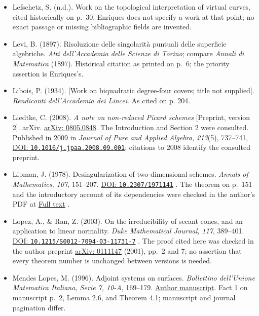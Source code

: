 \begin{sloppypar}
\begin{itemize}
\item Lefschetz, S. (n.d.). Work on the topological interpretation of virtual curves, cited historically on p.~30. Enriques does not specify a work at that point; no exact passage or missing bibliographic fields are invented.

\item Levi, B. (1897). Risoluzione delle singolarità puntuali delle superficie algebriche. \emph{Atti dell'Accademia delle Scienze di Torino}; compare \emph{Annali di Matematica} (1897). Historical citation as printed on p.~6; the priority assertion is Enriques's.

\item Libois, P. (1934). [Work on biquadratic degree-four covers; title not supplied]. \emph{Rendiconti dell'Accademia dei Lincei}. As cited on p. 204.

\item Liedtke, C. (2008). \emph{A note on non-reduced Picard schemes} {[}Preprint, version 2{]}. arXiv. \href{https://arxiv.org/abs/0805.0848}{arXiv: 0805.0848}. The Introduction and Section 2 were consulted. Published in 2009 in \emph{Journal of Pure and Applied Algebra, 213}(5), 737--741, \href{https://doi.org/10.1016/j.jpaa.2008.09.001}{DOI: \nolinkurl{10.1016/j.jpaa.2008.09.001}}; citations to 2008 identify the consulted preprint.

\item Lipman, J. (1978). Desingularization of two-dimensional schemes. \emph{Annals of Mathematics, 107}, 151--207. \href{https://doi.org/10.2307/1971141}{DOI: \nolinkurl{10.2307/1971141}} . The theorem on p.~151 and the introductory account of its dependencies were checked in the author's PDF at \href{https://www.math.purdue.edu/~jlipman/papers-older/\%5B1978\%5D\%20Desingularization\%20of\%20two-dimensional\%20schemes.pdf}{Full text} .

\item Lopez, A., \& Ran, Z. (2003). On the irreducibility of secant cones, and an application to linear normality. \emph{Duke Mathematical Journal, 117}, 389--401. \href{https://doi.org/10.1215/S0012-7094-03-11731-7}{DOI: \nolinkurl{10.1215/S0012-7094-03-11731-7}} . The proof cited here was checked in the author preprint \href{https://arxiv.org/abs/math/0111147}{arXiv: 0111147} (2001), pp.~2 and 7; no assertion that every theorem number is unchanged between versions is needed.

\item Mendes Lopes, M. (1996). Adjoint systems on surfaces. \emph{Bollettino dell'Unione Matematica Italiana, Serie 7, 10-A}, 169--179. \href{https://www.math.tecnico.ulisboa.pt/~mmlopes/ADJOINT.pdf}{Author manuscript}. Fact 1 on manuscript p.~2, Lemma 2.6, and Theorem 4.1; manuscript and journal pagination differ.


\end{itemize}
\end{sloppypar}
